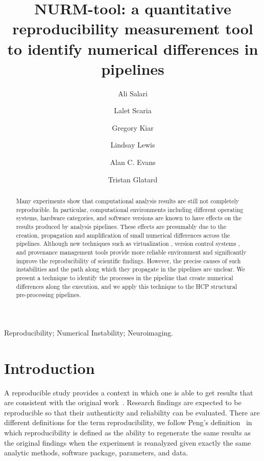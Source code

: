 \documentclass[a4paper,num-refs]{oup-contemporary}
\title{NURM-tool: a quantitative reproducibility measurement tool to 
identify numerical differences in pipelines}
\begin{document}
\author[1]{Ali Salari}
\author[1]{Lalet Scaria}
\author[2,3]{Gregory Kiar}
\author[2]{Lindsay Lewis}
\author[2,3]{Alan C. Evans}
\author[1]{Tristan Glatard}


\maketitle

\begin{abstract}
Many experiments show that computational analysis results are still not 
completely reproducible. In particular, computational environments 
including different operating systems, hardware categories, and 
software versions are known to have effects on the results produced by 
analysis pipelines. These effects are presumably due to the creation, 
propagation and amplification of small numerical differences across the 
pipelines. 
Although new techniques such as virtualization , version 
control systems , and provenance management tools provide more reliable 
environment and significantly improve the reproducibility of scientific 
findings. 
However, the precise causes of such instabilities and the path along 
which they propagate in the pipelines are unclear.  We present a 
technique to identify the processes in the pipeline that create 
numerical differences along the execution, and we apply this technique to 
the HCP structural pre-processing pipelines.

\end{abstract}

\begin{keywords}
Reproducibility; Numerical Instability; Neuroimaging.
\end{keywords}

\section{Introduction}

A reproducible study provides a context in which one is able to get 
results that are consistent with the original 
work~\cite{plesser2018reproducibility}. Research findings are expected 
to be reproducible so that their authenticity and reliability can be 
evaluated. 
There are different definitions for the term reproducibility, we follow 
Peng's definition~\cite{peng2011reproducible} in which reproducibility 
is defined as the ability to regenerate the same results as the 
original findings when the experiment is reanalyzed given exactly the 
same analytic methods, software package, parameters, and data. 
\end{document}
